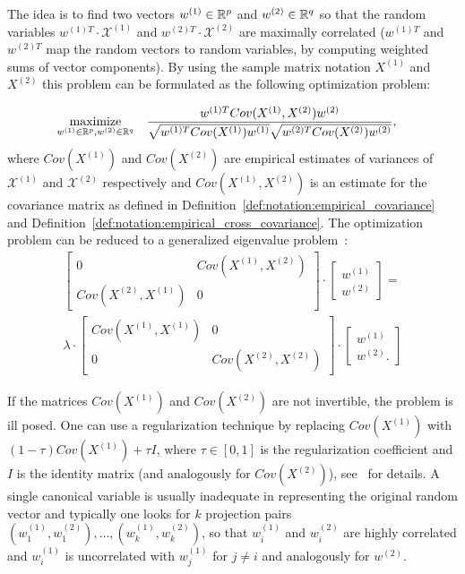 The idea is to find two vectors $w^{(1)} \in \mathbb{R}^p$ and $w^{(2)} \in \mathbb{R}^q$ so that the random variables
$w^{(1)T} \cdot \mathcal{X}^{(1)}$ and $w^{(2)T} \cdot \mathcal{X}^{(2)}$ are maximally correlated
($w^{(1)T}$ and $w^{(2)T}$ map the random vectors to random variables, by computing weighted
sums of vector components). By using the sample matrix notation $X^{(1)}$ and $X^{(2)}$ this problem can
be formulated as the following optimization problem:

\begin{equation}\label{eq:background:cca:original}
\begin{aligned}
& \underset{w^{(1)} \in \mathbb{R}^{p}, w^{(2)} \in \mathbb{R}^{q}}{\text{maximize}}
& & \frac{w^{(1)T} Cov(X^{(1)},X^{(2)}) w^{(2)}}{\sqrt{w^{(1)T} Cov(X^{(1)}) w^{(1)}} \sqrt{w^{(2)T} Cov(X^{(2)}) w^{(2)}}},
\end{aligned}
\end{equation}
where $Cov(X^{(1)})$ and $Cov(X^{(2)})$ are empirical estimates of variances of $\mathcal{X}^{(1)}$ and $\mathcal{X}^{(2)}$
respectively and $Cov(X^{(1)},X^{(2)})$ is an estimate for the covariance matrix as defined
in Definition~\ref{def:notation:empirical_covariance} and Definition~\ref{def:notation:empirical_cross_covariance}.
The optimization problem can be reduced to a generalized eigenvalue problem~\cite{HardoonCCA}:
\begin{align}\label{eq:background:cca:eigen}
\begin{bmatrix}
    0       & Cov(X^{(1)},X^{(2)}) \\
    Cov(X^{(2)},X^{(1)})& 0
\end{bmatrix}
\cdot
\begin{bmatrix}
    w^{(1)} \\
    w^{(2)}
\end{bmatrix}
=\\
\lambda
\cdot
\begin{bmatrix}
    Cov(X^{(1)},X^{(1)}) & 0 \\
    0 &  Cov(X^{(2)},X^{(2)})
\end{bmatrix}
\cdot
\begin{bmatrix}
    w^{(1)} \\
    w^{(2)}.
\end{bmatrix}
\end{align}

If the matrices $Cov(X^{(1)})$ and $Cov(X^{(2)})$ are not invertible, the problem is ill posed.
One can use a regularization technique by replacing $Cov(X^{(1)})$ with $(1- \tau)Cov(X^{(1)}) + \tau I$,
where $\tau \in [0,1]$ is the regularization coefficient and $I$ is the identity matrix (and analogously for $Cov(X^{(2)})$),
see~\cite{shawe-taylor04kernel} for details.
A single canonical variable is usually inadequate in representing the original random vector and typically one
looks for $k$ projection pairs $(w^{(1)}_1, w^{(2)}_1),\ldots,(w^{(1)}_k, w^{(2)}_k)$, so that $w^{(1)}_i$ and $w^{(2)}_i$ are
highly correlated and $w^{(1)}_i$ is uncorrelated with $w^{(1)}_j$  for $j \neq i$ and analogously for $w^{(2)}$.

